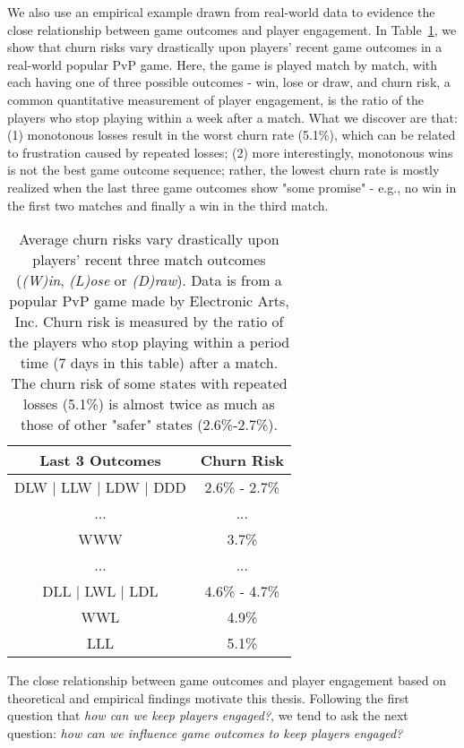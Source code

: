 We also use an empirical example drawn from real-world data to evidence the close relationship between game outcomes and player engagement. In Table~\ref{tab:churnrate}, we show that churn risks vary drastically upon players' recent game outcomes in a real-world popular PvP game. Here, the game is played match by match, with each having one of three possible outcomes - win, lose or draw, and churn risk, a common quantitative measurement of player engagement, is the ratio of the players who stop playing within a week after a match. What we discover are that: (1) monotonous losses result in the worst churn rate (5.1\%), which can be related to frustration caused by repeated losses; (2) more interestingly, monotonous wins is not the best game outcome sequence; rather, the lowest churn rate is mostly realized when the last three game outcomes show "some promise" - e.g., no win in the first two matches and finally a win in the third match.                   

\begin{table}
\centering
\caption{
Average churn risks vary drastically upon players' recent three match outcomes (\emph{(W)in}, \emph{(L)ose} or \emph{(D)raw}). Data is from a popular PvP game made by Electronic Arts, Inc. Churn risk is measured by the ratio of the players who stop playing within a period time (7 days in this table) after a match. The churn risk of some states with repeated losses (5.1\%) is almost twice as much as those of other "safer" states (2.6\%-2.7\%).
} \label{tab:churnrate}
\vspace{2mm}
\begin{tabular}{|c|c|}
\hline
Last 3 Outcomes & Churn Risk                      \\ \hline
DLW $|$ LLW $|$ LDW $|$ DDD      &  2.6\% - 2.7\%        \\
... & ...  \\
WWW   &  3.7\% \\
... & ... \\
DLL $|$ LWL $|$ LDL  &  4.6\% - 4.7\%  \\
WWL & 4.9\% \\
LLL & 5.1\% \\
\hline
\end{tabular}
\end{table}

The close relationship between game outcomes and player engagement based on theoretical and empirical findings motivate this thesis. Following the first question that \textit{how can we keep players engaged?}, we tend to ask the next question: \textit{how can we influence game outcomes to keep players engaged?}

